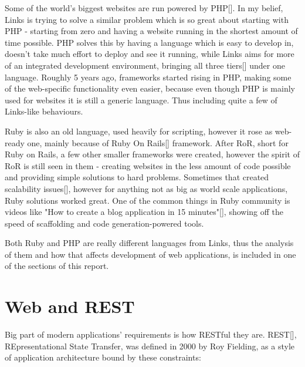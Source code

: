 Some of the world's biggest websites are run powered by PHP[]. In my belief, Links is trying to solve a similar problem which is so great about starting with PHP - starting from zero and having a website running in the shortest amount of time possible. PHP solves this by having a language which is easy to develop in, doesn't take much effort to deploy and see it running, while Links aims for more of an integrated development environment, bringing all three tiers[] under one language. Roughly 5 years ago, frameworks started rising in PHP, making some of the web-specific functionality even easier, because even though PHP is mainly used for websites it is still a generic language. Thus including quite a few of Links-like behaviours. 

Ruby is also an old language, used heavily for scripting, however it rose as web-ready one, mainly because of Ruby On Rails[] framework. After RoR, short for Ruby on Rails, a few other smaller frameworks were created, however the spirit of RoR is still seen in them - creating websites in the less amount of code possible and providing simple solutions to hard problems. Sometimes that created scalability issues[], however for anything not as big as world scale applications, Ruby solutions worked great. One of the common things in Ruby community is videos like "How to create a blog application in 15 minutes"[], showing off the speed of scaffolding and code generation-powered tools. 

Both Ruby and PHP are really different languages from Links, thus the analysis of them and how that affects development of web applications, is included in one of the sections of this report. 

\section{Web and REST}

Big part of modern applications' requirements is how RESTful they are. REST[], REpresentational State Transfer, was defined in 2000 by Roy Fielding, as a style of application architecture bound by these constraints:

